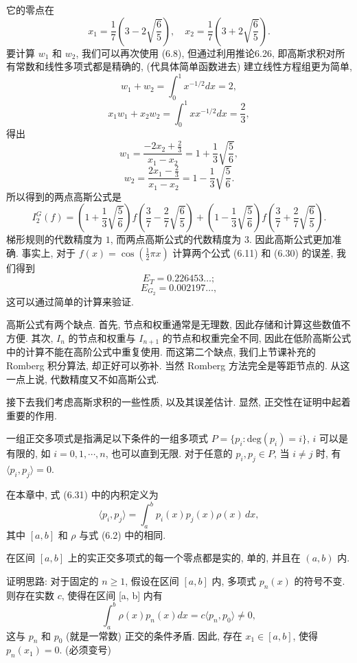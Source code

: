 \documentclass[a4paper]{ctexart}
\newcommand{\hl}[1]
{\noindent {\bf {#1}}}
\begin{document}
它的零点在
$$ 
x_1 = \frac{1}{7}\left(3 - 2\sqrt{\frac{6}{5}}\right), 
\quad x_2 = \frac{1}{7}\left(3 + 2\sqrt{\frac{6}{5}}\right). 
$$
要计算 $w_1$ 和 $w_2$, 我们可以再次使用 (6.8), 
但通过利用推论6.26, 即高斯求积对所有常数和线性多项式都是精确的, 
(代具体简单函数进去) 建立线性方程组更为简单, 
$$ 
w_1 + w_2 = \int_{0}^{1} x^{-1/2}dx = 2, 
$$
$$ 
x_1w_1 + x_2w_2 = \int_{0}^{1} xx^{-1/2}dx = \frac{2}{3}, 
$$
得出
$$ 
w_1 
= \frac{-2x_2 + \frac{2}{3}}{x_1 - x_2} 
= 1 + \frac{1}{3}\sqrt{\frac{5}{6}}, 
$$
$$ 
w_2 
= \frac{2x_1 - \frac{2}{3}}{x_1 - x_2} 
= 1 - \frac{1}{3}\sqrt{\frac{5}{6}}. 
$$
所以得到的两点高斯公式是
$$ 
I^G_2(f) 
= \left(1 + \frac{1}{3}\sqrt{\frac{5}{6}}\right)f\left(\frac{3}{7} 
- \frac{2}{7}\sqrt{\frac{6}{5}}\right) 
+ \left(1 - \frac{1}{3}\sqrt{\frac{5}{6}}\right)f\left(\frac{3}{7} 
+ \frac{2}{7}\sqrt{\frac{6}{5}}\right). 
$$ 
梯形规则的代数精度为 $1$, 而两点高斯公式的代数精度为 $3$. 
因此高斯公式更加准确. 
事实上, 对于 $f(x) = \cos\left(\frac{1}{2}\pi x\right)$ 计算两个公式 
(6.11) 和 (6.30) 的误差, 我们得到
$$ 
E_T = 0.226453\ldots; 
$$
$$ 
E_{G_2} = 0.002197\ldots, 
$$
这可以通过简单的计算来验证. 

高斯公式有两个缺点. 首先, 节点和权重通常是无理数, 因此存储和计算这些数值不方便. 其次, $I_n$ 
的节点和权重与 $I_{n+1}$ 的节点和权重完全不同, 因此在低阶高斯公式中的计算不能在高阶公式中重复使用.
而这第二个缺点, 我们上节课补充的 Romberg 积分算法, 却正好可以弥补. 当然 Romberg 方法完全是等距节点的. 
从这一点上说, 代数精度又不如高斯公式. 

接下去我们考虑高斯求积的一些性质, 以及其误差估计. 显然, 正交性在证明中起着重要的作用. 

\hl{定义 6.29} 一组正交多项式是指满足以下条件的一组多项式 
$P = \{p_i : \text{deg}(p_i) = i\}$, $i$ 可以是有限的, 如 $i = 0, 1, \cdots, n$, 也可以直到无限. 
对于任意的 $p_i, p_j \in P$, 当 $i \neq j$ 时, 有 $\langle p_i, p_j\rangle = 0$. 

\hl{例 6.30} 在本章中, 式 (6.31) 中的内积定义为
$$
\langle p_i, p_j\rangle = \int_{a}^{b} p_i(x) p_j(x) \rho(x) \, dx, 
$$
其中 $[a, b]$ 和 $\rho$ 与式 (6.2) 中的相同. 

\hl{定理 6.31} 在区间 $[a, b]$ 上的实正交多项式的每一个零点都是实的, 单的, 并且在 $(a, b)$ 内.

证明思路: 对于固定的 $n \geq 1$, 假设在区间 $[a, b]$ 内, 多项式 $p_n(x)$ 的符号不变. 
则存在实数 $c$, 使得在区间 [a, b] 内有
$$
\int_a^b \rho(x)p_n(x) dx = c \langle p_n, p_0 \rangle \neq 0,
$$
这与 $p_n$ 和 $p_0$ (就是一常数) 正交的条件矛盾. 因此, 存在 $x_1 \in [a, b]$, 使得 $p_n(x_1) = 0$.
(必须变号)
\end{document}
